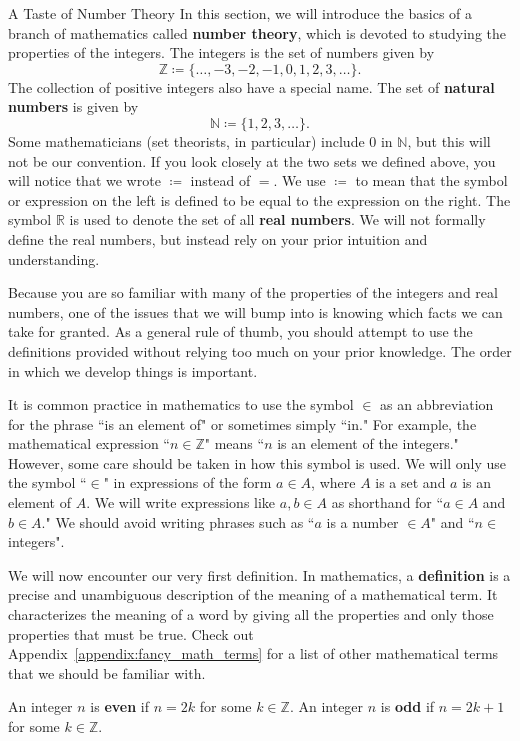 \begin{section}{A Taste of Number Theory}
In this section, we will introduce the basics of a branch of mathematics called \textbf{number theory}, which is devoted to studying the properties of the integers. The integers is the set of numbers given by
\[
\boxed{\mathbb{Z} \coloneqq  \{\ldots, -3, -2, -1, 0, 1, 2, 3, \ldots\}}.
\]
The collection of positive integers also have a special name.  The set of \textbf{natural numbers} is given by
\[
\boxed{\mathbb{N}\coloneqq \{1,2,3,\ldots\}}.
\]
Some mathematicians (set theorists, in particular) include $0$ in $\mathbb{N}$, but this will not be our convention. If you look closely at the two sets we defined above, you will notice that we wrote $\boxed{\coloneqq }$ instead of $=$.  We use $\coloneqq $ to mean that the symbol or expression on the left is defined to be equal to the expression on the right. The symbol $\boxed{\mathbb{R}}$ is used to denote the set of all \textbf{real numbers}. We will not formally define the real numbers, but instead rely on your prior intuition and understanding.

Because you are so familiar with many of the properties of the integers and real numbers, one of the issues that we will bump into is knowing which facts we can take for granted.  As a general rule of thumb, you should attempt to use the definitions provided without relying too much on your prior knowledge.  The order in which we develop things is important.

It is common practice in mathematics to use the symbol $\boxed{\in}$ as an abbreviation for the phrase ``is an element of" or sometimes simply ``in."  For example, the mathematical expression ``$n\in\mathbb{Z}$" means ``$n$ is an element of the integers."  However, some care should be taken in how this symbol is used. We will only use the symbol ``$\in$" in expressions of the form $\boxed{a \in A}$, where $A$ is a set and $a$ is an element of $A$.  We will write  expressions like $\boxed{a,b\in A}$  as shorthand for ``$a\in A$ and $b\in A$." We should avoid writing phrases such as ``$a$ is a number $\in A$" and ``$n \in$ integers".

We will now encounter our very first definition.  In mathematics, a \textbf{definition} is a precise and unambiguous description of the meaning of a mathematical term.  It characterizes the meaning of a word by giving all the properties and only those properties that must be true.  Check out Appendix~\ref{appendix:fancy_math_terms} for a list of other mathematical terms that we should be familiar with.

\begin{definition}
An integer $n$ is \textbf{even} if $n=2k$ for some $k\in\mathbb{Z}$. An integer $n$ is \textbf{odd} if $n=2k+1$ for some $k\in\mathbb{Z}$.
\end{definition}


\end{section}
